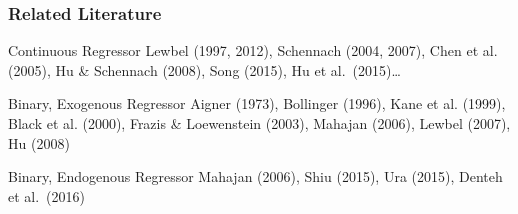 \documentclass{beamer}
\begin{document}
%   
\begin{frame}[label=MAHAJAN_BODY]
  \frametitle{Related Literature}
 
  \begin{block}{Continuous Regressor}
    \small
  Lewbel (1997, 2012), Schennach (2004, 2007), Chen et al. (2005), Hu \& Schennach (2008), Song (2015), Hu et al.\ (2015)\ldots 
  \end{block}

  \begin{block}{Binary, Exogenous Regressor}
    \small
   Aigner (1973), Bollinger (1996), Kane et al. (1999), Black et al. (2000), Frazis \& Loewenstein (2003), Mahajan (2006), Lewbel (2007), Hu (2008)
  \end{block}

  \begin{block}{Binary, Endogenous Regressor}
    \alert{Mahajan (2006)}, \small Shiu (2015), Ura (2015), Denteh et al.\ (2016)  
  \end{block}
\end{frame}
\end{document}
